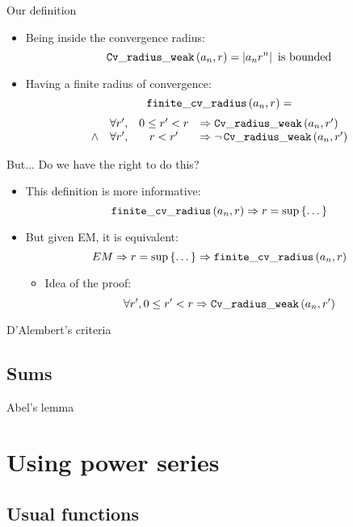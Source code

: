 \documentclass{beamer}
\begin{document}
\begin{frame}{Our definition}
\begin{itemize}
  \item Being inside the convergence radius:
  $$\operatorname{\mathtt{Cv\_radius\_weak}}{}(a_n,r) = \left| a_n r^n \right| \text{ is bounded}$$
  \item<2-> Having a finite radius of convergence:
  $$\operatorname{\mathtt{finite\_cv\_radius}}{}(a_n,r) =$$
  $$\begin{array}{clcl}
    & \forall r', & 0 \le r' < r & \Rightarrow \operatorname{\mathtt{Cv\_radius\_weak}}{}(a_n,r') \\
    \wedge & \forall r', & r < r' & \Rightarrow \neg \operatorname{\mathtt{Cv\_radius\_weak}}{}(a_n,r')
    \end{array}$$
\end{itemize}
\end{frame}

\begin{frame}{But... Do we have the right to do this?}
\begin{itemize}
  \item This definition is more informative:
    $$\operatorname{\mathtt{finite\_cv\_radius}}{}(a_n,r) \Rightarrow r = \sup \left\lbrace \dots \right\rbrace$$
  \item<2-> But given EM, it is equivalent:
    $$EM \Rightarrow r = \sup \left\lbrace \dots \right\rbrace \Rightarrow
    \operatorname{\mathtt{finite\_cv\_radius}}{}(a_n,r) $$
  \begin{itemize}
    \item<3> Idea of the proof:
      $$\forall r', 0 \le r' < r \Rightarrow \operatorname{\mathtt{Cv\_radius\_weak}}{}(a_n,r')$$
  \end{itemize}
\end{itemize}
\end{frame}

\begin{frame}{D'Alembert's criteria}
\end{frame}

\subsection{Sums}

\begin{frame}{Abel's lemma}
\end{frame}

\section{Using power series}

\subsection{Usual functions}
\end{document}
